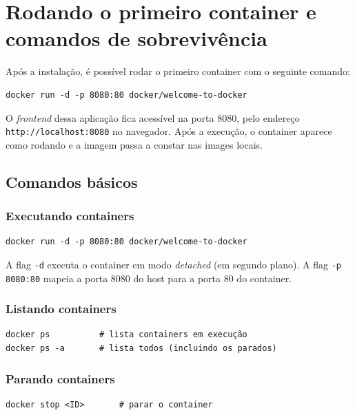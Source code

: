 \section{Rodando o primeiro container e comandos de sobrevivência}

Após a instalação, é possível rodar o primeiro container com o seguinte comando:

\begin{verbatim}
docker run -d -p 8080:80 docker/welcome-to-docker
\end{verbatim}

O \textit{frontend} dessa aplicação fica acessível na porta 8080, pelo endereço \texttt{http://localhost:8080} no navegador. Após a execução, o container aparece como rodando e a imagem passa a constar nas images locais.

\subsection{Comandos básicos}

\subsubsection{Executando containers}

\begin{verbatim}
docker run -d -p 8080:80 docker/welcome-to-docker
\end{verbatim}

A flag \texttt{-d} executa o container em modo \textit{detached} (em segundo plano). A flag \texttt{-p 8080:80} mapeia a porta 8080 do host para a porta 80 do container.

\subsubsection{Listando containers}

\begin{verbatim}
docker ps          # lista containers em execução
docker ps -a       # lista todos (incluindo os parados)
\end{verbatim}

\subsubsection{Parando containers}

\begin{verbatim}
docker stop <ID>       # parar o container
\end{verbatim}

